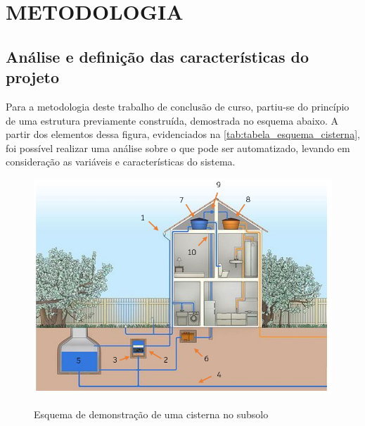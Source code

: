 
\chapter{METODOLOGIA}
\label{chap:metodologia}


\section{Análise e definição das características do projeto}

Para a metodologia deste trabalho de conclusão de curso, partiu-se do princípio de uma estrutura previamente construída, demostrada no esquema abaixo. A partir dos elementos dessa figura, evidenciados na \autoref{tab:tabela_esquema_cisterna}, foi possível realizar uma análise sobre o que pode ser automatizado, levando em consideração as variáveis e características do sistema.  

\begin{figure}[H]
	\centering
	\caption{Esquema de demonstração de uma cisterna no subsolo}
	\includegraphics[width=1.0\textwidth]{figuras/esquema_cisterna.png}
	\label{fig:esquema_cisterna}
\end{figure}

\newpage


